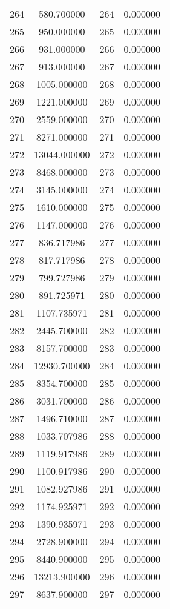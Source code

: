 \documentclass[12pt]{article}
\begin{document}
\begin{longtable}{@{}cccc@{}}
264 & 580.700000 & 264 & 0.000000 \\
265 & 950.000000 & 265 & 0.000000 \\
266 & 931.000000 & 266 & 0.000000 \\
267 & 913.000000 & 267 & 0.000000 \\
268 & 1005.000000 & 268 & 0.000000 \\
269 & 1221.000000 & 269 & 0.000000 \\
270 & 2559.000000 & 270 & 0.000000 \\
271 & 8271.000000 & 271 & 0.000000 \\
272 & 13044.000000 & 272 & 0.000000 \\
273 & 8468.000000 & 273 & 0.000000 \\
274 & 3145.000000 & 274 & 0.000000 \\
275 & 1610.000000 & 275 & 0.000000 \\
276 & 1147.000000 & 276 & 0.000000 \\
277 & 836.717986 & 277 & 0.000000 \\
278 & 817.717986 & 278 & 0.000000 \\
279 & 799.727986 & 279 & 0.000000 \\
280 & 891.725971 & 280 & 0.000000 \\
281 & 1107.735971 & 281 & 0.000000 \\
282 & 2445.700000 & 282 & 0.000000 \\
283 & 8157.700000 & 283 & 0.000000 \\
284 & 12930.700000 & 284 & 0.000000 \\
285 & 8354.700000 & 285 & 0.000000 \\
286 & 3031.700000 & 286 & 0.000000 \\
287 & 1496.710000 & 287 & 0.000000 \\
288 & 1033.707986 & 288 & 0.000000 \\
289 & 1119.917986 & 289 & 0.000000 \\
290 & 1100.917986 & 290 & 0.000000 \\
291 & 1082.927986 & 291 & 0.000000 \\
292 & 1174.925971 & 292 & 0.000000 \\
293 & 1390.935971 & 293 & 0.000000 \\
294 & 2728.900000 & 294 & 0.000000 \\
295 & 8440.900000 & 295 & 0.000000 \\
296 & 13213.900000 & 296 & 0.000000 \\
297 & 8637.900000 & 297 & 0.000000 \\

\end{longtable}
\end{document}
